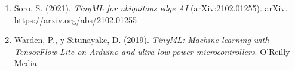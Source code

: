 \documentclass[12pt,letterpaper]{article}
\begin{document}
\begin{sloppypar}
\begin{enumerate}[leftmargin=1.2cm,itemsep=8pt]

\item Soro, S. (2021). \textit{TinyML for ubiquitous edge AI} (arXiv:2102.01255). arXiv. \url{https://arxiv.org/abs/2102.01255}

\item Warden, P., y Situnayake, D. (2019). \textit{TinyML: Machine learning with TensorFlow Lite on Arduino and ultra low power microcontrollers}. O'Reilly Media.

\end{enumerate}
\end{sloppypar}
\end{document}
